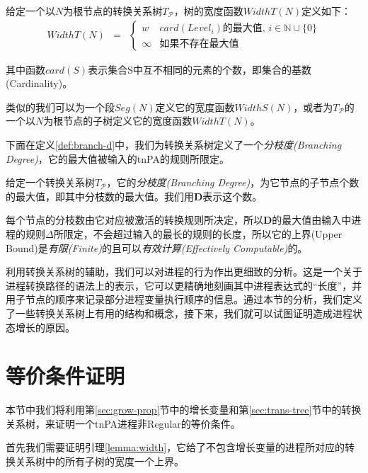 \begin{defn}\label{def:width}
给定一个以$N$为根节点的转换关系树$T_{\mathcal{P}}$，树的宽度函数$WidthT(N)$定义如下：
\begin{eqnarray*}
WidthT(N) &=& \left\{ \begin{array}{ll}
    w& \mbox{$card(Level_i)$的最大值, $i\in \mathbb{N}\cup\{0\}$}\\
    \infty &\mbox{如果不存在最大值}
    \end{array}\right.
\end{eqnarray*}
\end{defn}

其中函数$card(S)$表示集合S中互不相同的元素的个数，即集合的基数(Cardinality)。

类似的我们可以为一个段$Seg(N)$定义它的宽度函数$WidthS(N)$，或者为$T_{\mathcal{P}}$的一个以$N$为根节点的子树定义它的宽度函数$WidthT(N)$。

下面在定义\ref{def:branch-d}中，我们为转换关系树定义了一个\emph{分枝度(Branching Degree)}，它的最大值被输入的tnPA的规则所限定。

\begin{defn}\label{def:branch-d}
给定一个转换关系树$T_{\mathcal{P}}$，它的\emph{分枝度(Branching Degree)}，为它节点的子节点个数的最大值，即其中分枝数的最大值。我们用$\mathbf{D}$表示这个数。
\end{defn}

每个节点的分枝数由它对应被激活的转换规则所决定，所以$\mathbf{D}$的最大值由输入中进程的规则$\Delta$所限定，不会超过输入的最长的规则的长度，所以它的上界(Upper Bound)是\emph{有限(Finite)}的且可以\emph{有效计算(Effectively Computable)}的。

利用转换关系树的辅助，我们可以对进程的行为作出更细致的分析。这是一个关于进程转换路径的语法上的表示，它可以更精确地刻画其中进程表达式的“长度”，并用子节点的顺序来记录部分进程变量执行顺序的信息。通过本节的分析，我们定义了一些转换关系树上有用的结构和概念，接下来，我们就可以试图证明造成进程状态增长的原因。

\section{等价条件证明}
\label{sec:equiv-proof}

本节中我们将利用第\ref{sec:grow-prop}节中的增长变量和第\ref{sec:trans-tree}节中的转换关系树，来证明一个tnPA进程非Regular的等价条件。

首先我们需要证明引理\ref{lemma:width}，它给了不包含增长变量的进程所对应的转换关系树中的所有子树的宽度一个上界。

